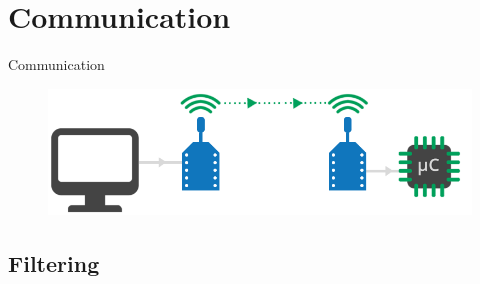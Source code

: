 \section{Communication}

\begin{frame}{Communication}{}
  \begin{figure}
  	\includegraphics[scale = .45]{Pictures/xbeeSerialConnection.png}
  \end{figure}
\end{frame}

\subsection{Filtering}

